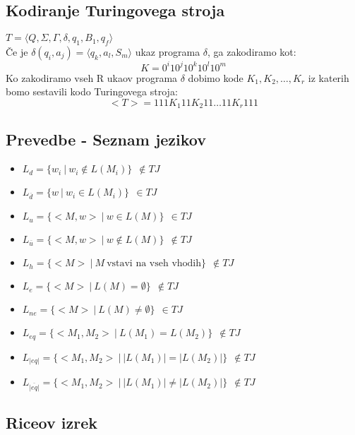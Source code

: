 \documentclass[a4paper]{article}
\begin{document}
\begin{multicols}{2}

\subsection*{Kodiranje Turingovega stroja}
$T=\langle Q,\Sigma,\Gamma,\delta,q_1,B_1,q_f \rangle$ \\
Če je $\delta(q_i,a_j)=\langle q_k, a_l, S_m \rangle$ ukaz programa $\delta$, ga zakodiramo kot:
	\[ K=0^i 1 0^j 1 0^k 1 0^l 1 0^m\]
Ko zakodiramo vseh R ukaov programa $\delta$ dobimo kode $K_1, K_2, \dots, K_r$ iz katerih bomo sestavili kodo Turingovega stroja:
	\[ <T> = 111 K_1 11 K_2 11 \dots 11 K_r 111\]%

\subsection*{Prevedbe - Seznam jezikov}
\begin{itemize}

\item $L_d = \lbrace w_i \ | \ w_i \not\in L(M_i) \rbrace \ \ \not\in TJ $ 
\item $L_{\overline{d}} = \lbrace w \ | \ w_i \in L(M_i) \rbrace \ \ \in TJ $ 
\item $L_u = \lbrace <M,w> \ | \ w \in L(M) \rbrace \ \ \in TJ $ 
\item $L_{\overline{u}} = \lbrace <M,w> \ | \ w \not\in L(M) \rbrace \ \ \not\in TJ $ 
\item $L_h = \lbrace <M> \ | \ M \ \text{vstavi na vseh vhodih} \rbrace \ \ \not\in TJ $ 
\item $L_e = \lbrace <M> \ | \ L(M) = \emptyset \rbrace \ \ \not\in TJ $ 
\item $L_{ne} = \lbrace <M> \ | \ L(M) \neq \emptyset \rbrace \ \ \in TJ $ 
\item $L_{eq} = \lbrace <M_1,M_2> \ | \ L(M_1) = L(M_2) \rbrace \ \ \not\in TJ $ 
\item $L_{|eq|} = \lbrace <M_1,M_2> \ | \ |L(M_1)| = |L(M_2)| \rbrace \ \ \not\in TJ $ 
\item $L_{ \overline{ |eq|}} = \lbrace <M_1,M_2> \ | \ |L(M_1)| \neq |L(M_2)| \rbrace \ \ \not\in TJ $ 

\end{itemize}

\subsection*{Riceov izrek}


\end{multicols}
\end{document}
